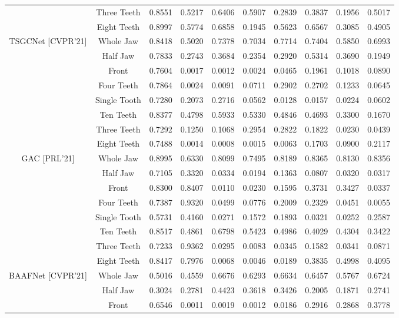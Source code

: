 \documentclass[letterpaper, 10 pt, conference]{ieeeconf}  %
\begin{document}
\begin{table*}[htbp]
\begin{tabular}{|c|c|c|c|c |c |c |c |c |c|}
& Three Teeth & 0.8551& 0.5217& 0.6406& 0.5907& 0.2839& 0.3837& 0.1956& 0.5017\\
& Eight Teeth & 0.8997& 0.5774& 0.6858& 0.1945& 0.5623& 0.6567& 0.3085& 0.4905\\
\hline
{TSGCNet [CVPR'21]} & Whole Jaw  & 0.8418 & 0.5020 & 0.7378 & 0.7034 & 0.7714 & 0.7404 & 0.5850 & 0.6993\\
& Half Jaw & 0.7833 & 0.2743 & 0.3684 & 0.2354 & 0.2920 & 0.5314 & 0.3690 & 0.1949 \\
& Front & 0.7604 & 0.0017 & 0.0012 & 0.0024 & 0.0465 & 0.1961 & 0.1018 & 0.0890 \\
& Four Teeth & 0.7864 & 0.0024 & 0.0091 & 0.0711 & 0.2902 & 0.2702 & 0.1233 & 0.0645 \\
& Single Tooth & 0.7280 & 0.2073 & 0.2716 & 0.0562 & 0.0128 & 0.0157 & 0.0224 & 0.0602\\
& Ten Teeth & 0.8377& 0.4798& 0.5933& 0.5330& 0.4846& 0.4693& 0.3300& 0.1670\\
& Three Teeth & 0.7292& 0.1250& 0.1068& 0.2954& 0.2822& 0.1822& 0.0230& 0.0439\\
& Eight Teeth & 0.7488& 0.0014& 0.0008& 0.0015& 0.0063& 0.1703& 0.0900& 0.2117\\
\hline
{GAC [PRL'21]}  & Whole Jaw  & 0.8995 & 0.6330 & 0.8099 & 0.7495 & 0.8189 & 0.8365 & 0.8130 & 0.8356\\
& Half Jaw & 0.7105 & 0.3320 & 0.0334 & 0.0194 & 0.1363 & 0.0807 & 0.0320 & 0.0317\\
& Front & 0.8300 & 0.8407 & 0.0110 & 0.0230 & 0.1595 & 0.3731 & 0.3427 & 0.0337 \\
& Four Teeth & 0.7387 & 0.9320 & 0.0499 & 0.0776 & 0.2009 & 0.2329 & 0.0451 & 0.0055\\
& Single Tooth & 0.5731 & 0.4160 & 0.0271 & 0.1572 & 0.1893 & 0.0321 & 0.0252 & 0.2587\\
& Ten Teeth & 0.8517& 0.4861& 0.6798& 0.5423& 0.4986& 0.4029& 0.4304& 0.3422\\
& Three Teeth & 0.7233& 0.9362& 0.0295& 0.0083& 0.0345& 0.1582& 0.0341& 0.0871\\
& Eight Teeth & 0.8417& 0.7976& 0.0068& 0.0046& 0.0189& 0.3835& 0.4998& 0.4095\\
\hline
{BAAFNet [CVPR'21]} & Whole Jaw & 0.5016 & 0.4559 & 0.6676 & 0.6293 & 0.6634 & 0.6457 & 0.5767 & 0.6724\\
& Half Jaw & 0.3024 & 0.2781 & 0.4423 & 0.3618 & 0.3426 & 0.2005 & 0.1871 & 0.2741\\
& Front & 0.6546 & 0.0011 & 0.0019 & 0.0012 & 0.0186 & 0.2916 & 0.2868 & 0.3778 \\

\end{tabular}
\end{table*}
\end{document}
